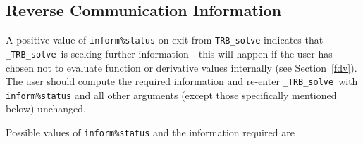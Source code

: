 \documentclass{galahad}
\newcommand{\packagename}{TRB}
\newcommand{\fullpackagename}{\libraryname\_\packagename}
\newcommand{\solver}{{\tt \fullpackagename\_solve}}
\begin{document}

\subsection{\label{reverse}Reverse Communication Information}

A positive value of {\tt inform\%status} on exit from
{\tt \packagename\_solve}
indicates that
\solver\ is seeking further information---this will happen
if the user has chosen not to evaluate function or
derivative values internally (see Section~\ref{fdv}).
The user should compute the required information and re-enter \solver\
with {\tt inform\%status} and all other arguments (except those specifically
mentioned below) unchanged.

Possible values of {\tt inform\%status} and the information required are
\end{document}
